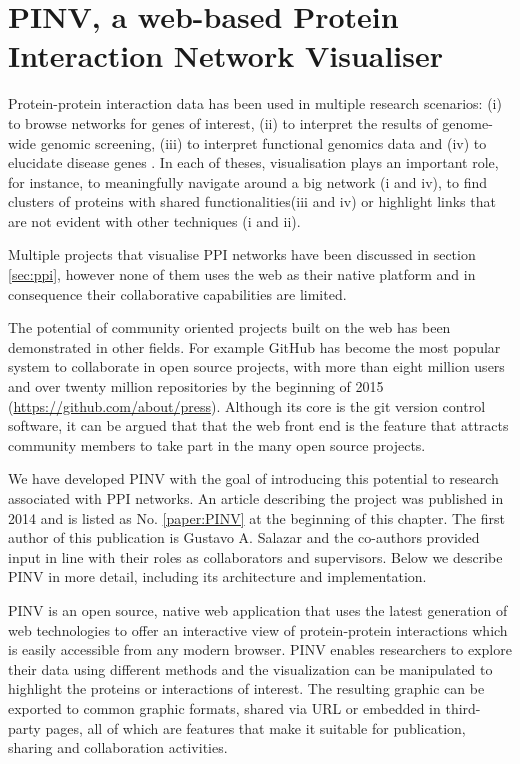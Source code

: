 \newpage





\section{PINV, a web-based Protein Interaction Network Visualiser }  \label{section:pinv}
Protein-protein interaction data has been used in multiple research scenarios: (i) to browse networks for genes of interest, (ii) to interpret the results of genome-wide genomic screening, (iii) to interpret functional genomics data and (iv) to elucidate disease genes \cite{FRA2013}. In each of theses, visualisation plays an important role, for instance,  to meaningfully navigate around a big network (i and iv), to find clusters of proteins with shared functionalities(iii and iv)  or highlight links that are not evident with other techniques (i and ii).

Multiple projects that visualise PPI networks have been discussed in section \ref{sec:ppi}, however none of them uses the web as their native platform and in consequence their collaborative capabilities are limited.

The potential of community oriented projects built on the web has been demonstrated in other fields. For example GitHub has become the most popular system to collaborate in open source projects, with more than eight million users and over twenty million repositories by the beginning of 2015 (\url{https://github.com/about/press}). Although its core is the git version control software, it can be argued that that the web front end is the  feature that attracts  community members to take part in the many open source projects.

We have developed PINV with the goal of introducing this potential to research associated with PPI networks. An article describing the project was published in 2014 and is listed as No. \ref{paper:PINV} at the beginning of this chapter. The first author of this publication is Gustavo A. Salazar and the co-authors provided input in line with their roles as collaborators and supervisors. Below we describe PINV in more detail, including its architecture and implementation.

PINV is an open source, native web application that uses the latest generation of web technologies to offer an interactive view of protein-protein interactions which is easily accessible from any modern browser. PINV enables researchers to explore their data using different methods and the visualization can be manipulated to highlight the proteins or interactions of interest. The resulting graphic can be exported to common graphic formats, shared via URL or embedded in third-party pages, all of which are features that make it suitable for publication, sharing and collaboration activities.

